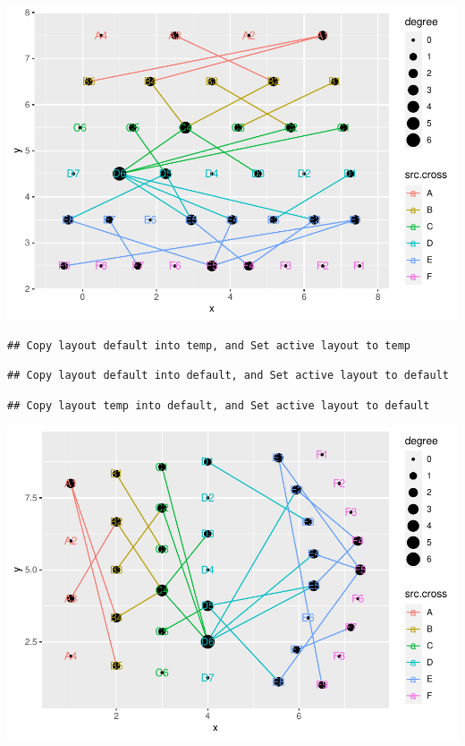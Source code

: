 \documentclass[
]{article}
\newenvironment{Shaded}{\begin{snugshade}}{\end{snugshade}}
\newcommand{\CommentTok}[1]{\textcolor[rgb]{0.56,0.35,0.01}{\textit{#1}}}
\newcommand{\DataTypeTok}[1]{\textcolor[rgb]{0.13,0.29,0.53}{#1}}
\newcommand{\DecValTok}[1]{\textcolor[rgb]{0.00,0.00,0.81}{#1}}
\newcommand{\KeywordTok}[1]{\textcolor[rgb]{0.13,0.29,0.53}{\textbf{#1}}}
\newcommand{\NormalTok}[1]{#1}
\newcommand{\OperatorTok}[1]{\textcolor[rgb]{0.81,0.36,0.00}{\textbf{#1}}}
\newcommand{\StringTok}[1]{\textcolor[rgb]{0.31,0.60,0.02}{#1}}
\begin{document}
\includegraphics{ReadMe_files/figure-latex/unnamed-chunk-7-3.pdf}

\begin{Shaded}
\end{Shaded}

\begin{verbatim}
## Copy layout default into temp, and Set active layout to temp
\end{verbatim}

\begin{verbatim}
## Copy layout default into default, and Set active layout to default
\end{verbatim}

\begin{verbatim}
## Copy layout temp into default, and Set active layout to default
\end{verbatim}

\includegraphics{ReadMe_files/figure-latex/unnamed-chunk-7-4.pdf}
\end{document}
